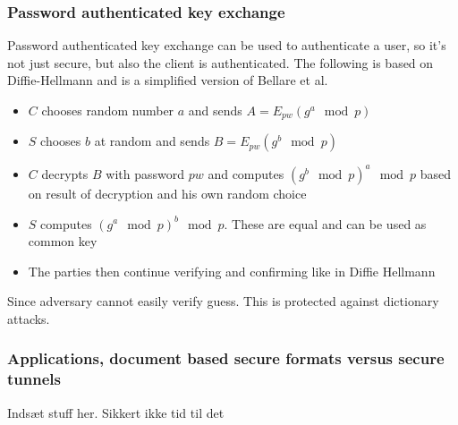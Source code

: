 \documentclass[14pt]{beamer}
\begin{document}
    \begin{frame}
        \frametitle{Password authenticated key exchange}
            Password authenticated key exchange can be used to authenticate a user, so it's not just secure, but also the client is authenticated. The following is based on Diffie-Hellmann and is a simplified version of Bellare et al.
            \begin{itemize}
                \item $C$ chooses random number $a$ and sends $A = E_{pw}(g^a \mod p)$
                \item $S$ chooses $b$ at random and sends $B = E_{pw}(g^b \mod p)$
                \item $C$ decrypts $B$ with password $pw$ and computes $(g^b \mod p)^a \mod p$ based on result of decryption and his own random choice
                \item $S$ computes $(g^a \mod p)^b \mod p$. These are equal and can be used as common key
                \item The parties then continue verifying and confirming like in Diffie Hellmann
            \end{itemize}
            Since adversary cannot easily verify guess. This is protected against dictionary attacks. 

    \end{frame}


    \begin{frame}
        \frametitle{Applications, document based secure formats versus secure tunnels}
            Indsæt stuff her. Sikkert ikke tid til det
    \end{frame}
\end{document}
